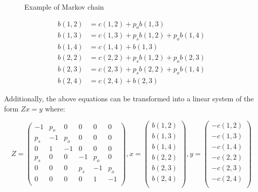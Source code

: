 \begin{multicols*}{2}
    \begin{figure}[H]
        \scalebox{0.50}{}
        \caption{Example of Markov chain}
        \label{fig:example-algeb-blocking}
    \end{figure}
    \columnbreak
    \begin{align}
        b(1,2) &= c(1,2) + p_o b(1,3) \label{eq:first_eq_of_blocking_example} \\
        b(1,3) &= c(1,3) + p_s b(1,2) + p_o b(1,4) \\
        b(1,4) &= c(1,4) + b(1,3) \\
        b(2,2) &= c(2,2) + p_s b(1,2) + p_o b(2,3) \\
        b(2,3) &= c(2,3) + p_s b(2,2) + p_o b(1,4) \\
        b(2,4) &= c(2,4) + b(2,3)\label{eq:last_eq_of_blocking_example}
    \end{align}
\end{multicols*}

Additionally, the above equations can be transformed into a linear system of the 
form \(Zx=y\) where:

\begin{equation}\label{eq:example-algebaric-approach-blocking-time}
    Z=
    \begin{pmatrix}
        -1 & p_o & 0 & 0 & 0 & 0 \\ %
        p_s & -1 & p_o & 0 & 0 & 0 \\ %
        0 & 1 & -1 & 0 & 0 & 0 \\ %
        p_s & 0 & 0 & -1 & p_o & 0\\ %
        0 & 0 & 0 & p_s & -1 & p_o \\ %
        0 & 0 & 0 & 0 & 1 & -1 \\ %
    \end{pmatrix},
    x=
    \begin{pmatrix}
        b(1,2) \\
        b(1,3) \\
        b(1,4) \\
        b(2,2) \\
        b(2,3) \\
        b(2,4) \\
    \end{pmatrix}, 
    y=
    \begin{pmatrix}
        -c(1,2) \\
        -c(1,3) \\
        -c(1,4) \\
        -c(2,2) \\
        -c(2,3) \\
        -c(2,4) \\
    \end{pmatrix}
\end{equation}

